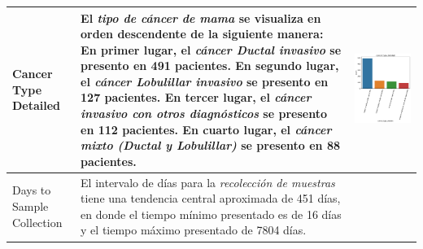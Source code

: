 \begin{table}[!htb]
	\footnotesize
	\begin{threeparttable}
		\begin{tabular}{p{2.5cm} p{7cm} p{6.5cm}} \toprule
			Cancer Type Detailed
			& El \textit{tipo de cáncer de mama} se visualiza en orden descendente de la siguiente manera: En primer lugar, el \textit{cáncer Ductal invasivo} se presento en 491 pacientes. En segundo  lugar, el \textit{cáncer Lobulillar invasivo} se presento en 127 pacientes. En tercer lugar, el \textit{cáncer invasivo con otros diagnósticos} se presento en 112 pacientes. En cuarto lugar,  el \textit{cáncer mixto (Ductal y Lobulillar)} se presento en 88 pacientes.
			
			& \begin{center}\includegraphics[width=1\linewidth]{NOTEBOOK/IMAGENES_DESCRIPTIVAS/6_cancer_type_detailed}\end{center}
			\\ \hline
			Days to Sample Collection
			& El intervalo de días para la \textit{recolección de muestras} tiene una tendencia central aproximada de 451 días, en donde el tiempo mínimo presentado es de 16 días y el tiempo máximo presentado de 7804 días.
			

\end{tabular}
\end{threeparttable}
\end{table}
